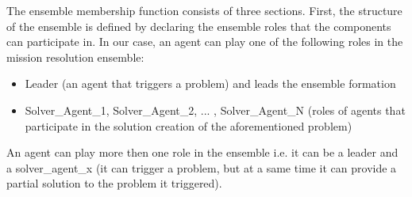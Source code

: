 \documentclass[journal]{IEEEtran}
\theoremstyle{definition}
\begin{document}
The ensemble membership function 
consists of three sections. First, the
structure of the ensemble is defined by declaring the ensemble
roles that the components can participate in.
In our case, an agent can play one of the following roles in the mission resolution ensemble:
\begin{itemize}
\item Leader (an agent that triggers a problem) and leads the ensemble formation
\item Solver\_Agent\_1, Solver\_Agent\_2, ... , Solver\_Agent\_N  (roles of agents that participate in the solution creation of the aforementioned problem)
\end{itemize}
An agent can play more then one role in the ensemble i.e. it can be a leader and a solver\_agent\_x (it can trigger a problem, but at a same time it can provide a partial solution to the problem it triggered).


\end{document}
